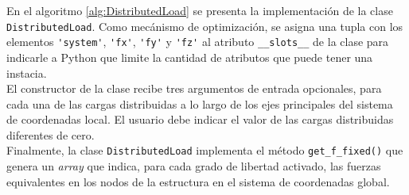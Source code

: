 En el algoritmo \ref{alg:DistributedLoad} se presenta la implementación de la clase \verb|DistributedLoad|. Como mecánismo de optimización, se asigna una tupla con los elementos \verb|'system'|, \verb|'fx'|, \verb|'fy'| y \verb|'fz'| al atributo \verb|__slots__| de la clase para indicarle a Python que limite la cantidad de atributos que puede tener una instacia.\\

El constructor de la clase recibe tres argumentos de entrada opcionales, para cada una de las cargas distribuidas a lo largo de los ejes principales del sistema de coordenadas local. El usuario debe indicar el valor de las cargas distribuidas diferentes de cero.\\

Finalmente, la clase \verb|DistributedLoad| implementa el método \verb|get_f_fixed()| que genera un \emph{array} que indica, para cada grado de libertad activado, las fuerzas equivalentes en los nodos de la estructura en el sistema de coordenadas global.\\


